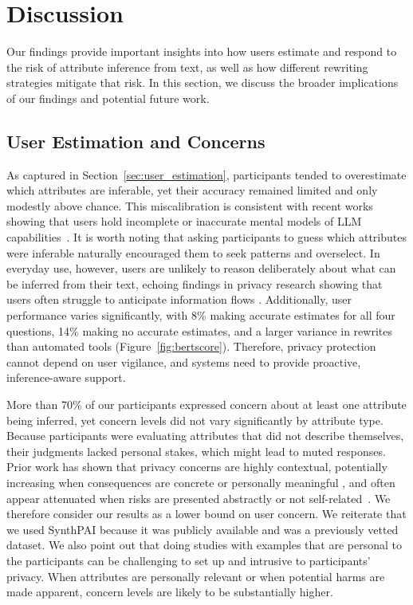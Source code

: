 \section{Discussion}
Our findings provide important insights into how users estimate and respond to the risk of attribute inference from text, as well as how different rewriting strategies mitigate that risk. In this section, we discuss the broader implications of our findings and potential future work.

\subsection{User Estimation and Concerns}
\label{subsec:discuss-awareness}
As captured in Section~\ref{sec:user_estimation}, participants tended to overestimate which attributes are inferable, yet their accuracy remained limited and only modestly above chance. This miscalibration is consistent with recent works showing that users hold incomplete or inaccurate mental models of LLM capabilities~\cite{li2024humancenteredprivacyresearchage, windl2022contextualprivacy}. It is worth noting that asking participants to guess which attributes were inferable naturally encouraged them to seek patterns and overselect. In everyday use, however, users are unlikely to reason deliberately about what can be inferred from their text, echoing findings in privacy research showing that users often struggle to anticipate information flows \cite{malki2025hoovered, zhang2024s}. Additionally, user performance varies significantly, with 8\% making accurate estimates for all four questions, 14\% making no accurate estimates, and a larger variance in rewrites than automated tools (Figure~\ref{fig:bertscore}). Therefore, privacy protection cannot depend on user vigilance, and systems need to provide proactive, inference-aware support.

More than 70\% of our participants expressed concern about at least one attribute being inferred, yet concern levels did not vary significantly by attribute type. Because participants were evaluating attributes that did not describe themselves, their judgments lacked personal stakes, which might lead to muted responses. Prior work has shown that privacy concerns are highly contextual, potentially increasing when consequences are concrete or personally meaningful \cite{nissenbaum2004privacy}, and often appear attenuated when risks are presented abstractly or not self-related~\cite{WOODRING2024103997}. We therefore consider our results as a lower bound on user concern. We reiterate that we used SynthPAI because it was publicly available and was a previously vetted dataset. We also point out that doing studies with examples that are personal to the participants can be challenging to set up and intrusive to participants' privacy. When attributes are personally relevant or when potential harms are made apparent, concern levels are likely to be substantially higher.

